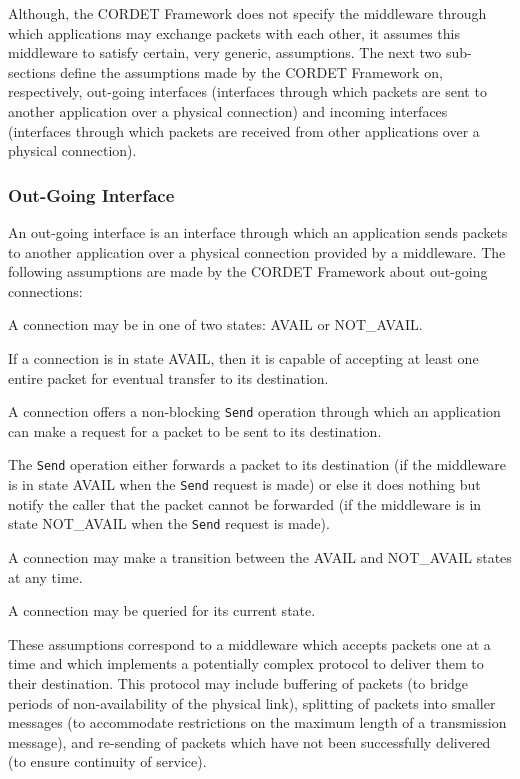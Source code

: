 Although, the CORDET Framework does not specify the middleware through which applications may exchange packets with each other, it assumes this middleware to satisfy certain, very generic, assumptions. The next two sub-sections define the assumptions made by the CORDET Framework on, respectively, out-going interfaces (interfaces through which packets are sent to another application over a physical connection) and incoming interfaces (interfaces through which packets are received from other applications over a physical connection).

\subsubsection{Out-Going Interface}\label{sec:OutGoingConnections}

An out-going interface is an interface through which an application sends packets to another application over a physical connection provided by a middleware. The following assumptions are made by the CORDET Framework about out-going connections:

\begin{fw_itemize}
\item[A1]{A connection may be in one of two states: AVAIL or NOT\_AVAIL.}
\item[A2]{If a connection is in state AVAIL, then it is capable of accepting at least one entire packet for eventual transfer to its destination.}
\item[A3]{A connection offers a non-blocking \texttt{Send} operation through which an application can make a request for a packet to be sent to its destination.}
\item[A4]{The \texttt{Send} operation either forwards a packet to its destination (if the middleware is in state AVAIL when the \texttt{Send} request is made) or else it does nothing but notify the caller that the packet cannot be forwarded (if the middleware is in state NOT\_AVAIL when the \texttt{Send} request is made).}
\item[A5]{A connection may make a transition between the AVAIL and NOT\_AVAIL states at any time.}
\item[A6]{A connection may be queried for its current state.}
\end{fw_itemize}

These assumptions correspond to a middleware which accepts packets one at a time and which implements a potentially complex protocol to deliver them to their destination. This protocol may include buffering of packets (to bridge periods of non-availability of the physical link), splitting of packets into smaller messages (to accommodate restrictions on the maximum length of a transmission message), and re-sending of packets which have not been successfully delivered (to ensure continuity of service). 

